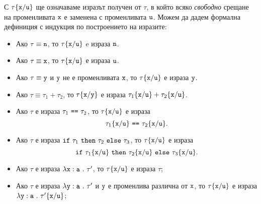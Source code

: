 



С $\tau\{\texttt{x}/\texttt{u}\}$ ще означаваме изразът получен от $\tau$, в който всяко \emph{свободно} срещане на променливата $\texttt{x}$
е заменена с променливата $\texttt{u}$. Можем да дадем формална дефиниция с индукция по построението на изразите:
\begin{itemize}
\item
  Ако $\tau \equiv \texttt{n}$, то $\tau\{\texttt{x}/\texttt{u}\}$ e израза $\texttt{n}$.
\item
  Ако $\tau \equiv \texttt{x}$, то $\tau\{\texttt{x}/\texttt{u}\}$ е израза $\texttt{u}$.
\item
  Ако $\tau \equiv \texttt{y}$ и $\texttt{y}$ не е променливата $\texttt{x}$, то $\tau\{\texttt{x}/\texttt{u}\}$ е израза $\texttt{y}$.
\item
  Ако $\tau \equiv \tau_1 + \tau_2$, то
  $\tau\{\texttt{x}/\texttt{y}\}$ е израза $\tau_1\{\texttt{x}/\texttt{u}\} + \tau_2\{\texttt{x}/\texttt{u}\}$.
\item
  Ако $\tau$ е израза $\tau_1\ \texttt{==}\ \tau_2$, то $\tau\{\texttt{x}/\texttt{u}\}$ е израза
  \[\tau_1\rename{x}{u}\ \vv{==}\ \tau_2\rename{x}{u}.\]
\item
  Ако $\tau$ е израза $\texttt{if}\ \tau_1\ \texttt{then}\ \tau_2\ \texttt{else}\ \tau_3$, то $\tau\{\texttt{x}/\texttt{u}\}$ е израза
  \[\texttt{if}\ \tau_1\{\texttt{x}/\texttt{u}\}\ \texttt{then}\ \tau_2\{\texttt{x}/\texttt{u}\}\ \texttt{else}\ \tau_3\{\texttt{x}/\texttt{u}\}.\]
\item
  Ако $\tau$ е израза $\lambda\texttt{x}:\texttt{a}\ .\ {\tau'}$, то
  $\tau\{\texttt{x}/\texttt{u}\}$ е израза $\tau$;
\item
  Ако $\tau$ е израза $\lambda\texttt{y}:\texttt{a}\ .\ {\tau'}$ и $\texttt{y}$ е променлива различна от $\texttt{x}$, то
  $\tau\{\texttt{x}/\texttt{u}\}$ е израза $\lambda\texttt{y}:\texttt{a}\ .\ {\tau'\{\texttt{x}/\texttt{u}\}}$;
\end{itemize}

